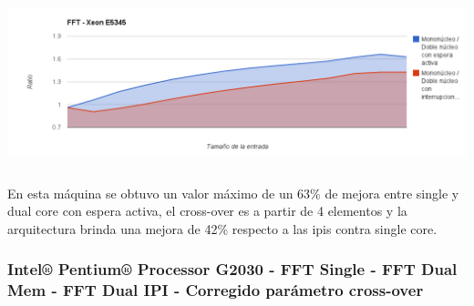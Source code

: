 \begin{center}
	    \includegraphics[height=5cm]{images/fft_xeon_e5345.png}
\end{center}

En esta máquina se obtuvo un valor máximo de un 63\% de mejora entre single y dual core con espera activa, el cross-over es a partir de 4 elementos y la arquitectura brinda una mejora de 42\% respecto a las ipis contra single core.

\subsubsection{Intel® Pentium® Processor G2030 - FFT Single - FFT Dual Mem - FFT Dual IPI - Corregido parámetro cross-over}

